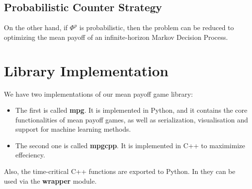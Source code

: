 \subsection{Probabilistic Counter Strategy}
On the other hand, if $\Phi^p$ is probabilistic, then the problem can be reduced to optimizing the mean payoff of an infinite-horizon Markov Decision Process.

\section{Library Implementation}
We have two implementations of our mean payoff game library:
\begin{itemize}
	\item The first is called \textbf{mpg}. It is implemented in Python, and it contains the core functionalities of mean payoff games, as well as serialization, visualisation and support for machine learning methods.
	\item The second one is called \textbf{mpgcpp}. It is implemented in C++ to maximimize effeciency.
\end{itemize}
Also, the time-critical C++ functions are exported to Python. In they can be used via the \textbf{wrapper} module.

